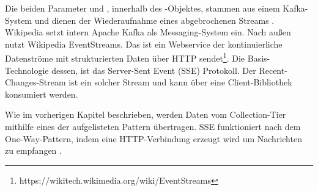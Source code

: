 Die beiden Parameter  und , innerhalb des -Objektes, stammen aus einem Kafka-System
und dienen der Wiederaufnahme eines abgebrochenen Streams \cite{WikimediaManual}. Wikipedia setzt intern Apache Kafka als Messaging-System ein.
Nach außen nutzt Wikipedia EventStreams. Das ist ein Webservice der kontinuierliche Datenströme mit strukturierten Daten
über HTTP sendet\footnote{https://wikitech.wikimedia.org/wiki/EventStreams}. Die Basis-Technologie dessen, ist
das Server-Sent Event (SSE) Protokoll. Der Recent-Changes-Stream ist ein solcher Stream und kann über eine Client-Bibliothek
konsumiert werden.

Wie im vorherigen Kapitel beschrieben, werden Daten vom Collection-Tier mithilfe eines der aufgelisteten Pattern übertragen.
SSE funktioniert nach dem One-Way-Pattern, indem eine HTTP-Verbindung erzeugt wird um Nachrichten zu empfangen \cite{EventSource_SSE}.

